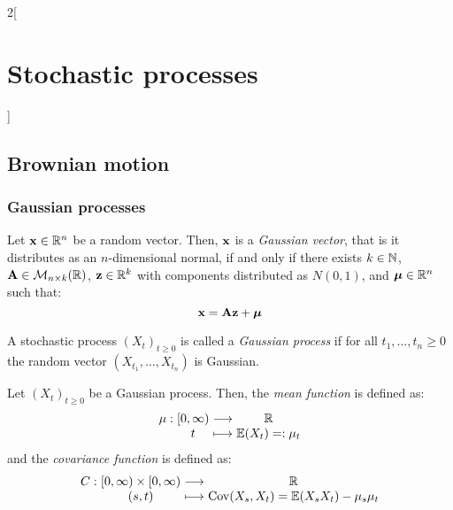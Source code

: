\documentclass[../../../main_math.tex]{subfiles}
\begin{document}
\begin{multicols}{2}[\section{Stochastic processes}]
  \subsection{Brownian motion}
  \subsubsection{Gaussian processes}
  \begin{proposition}\label{SP:Gaussian_vector}
    Let $\boldsymbol{\mathrm{x}}\in \mathbb{R}^n$ be a random vector. Then, $\boldsymbol{\mathrm{x}}$ is a \emph{Gaussian vector}, that is it distributes as an $n$-dimensional normal, if and only if there exists $k\in\mathbb{N}$, $\boldsymbol{\mathrm{A}}\in\mathcal{M}_{n\times k}(\mathbb{R})$, $\boldsymbol{\mathrm{z}}\in\mathbb{R}^k$ with \iid components distributed as $N(0,1)$, and $\boldsymbol{\mathrm{\mu}}\in\mathbb{R}^n$ such that: $$\boldsymbol{\mathrm{x}}=\boldsymbol{\mathrm{A}}\boldsymbol{\mathrm{z}}+\boldsymbol{\mathrm{\mu}}$$
  \end{proposition}
  \begin{definition}
    A stochastic process ${(X_t)}_{t\geq 0}$ is called a \emph{Gaussian process} if for all $t_1,\ldots,t_n\geq 0$ the random vector $(X_{t_1},\ldots,X_{t_n})$ is Gaussian.
  \end{definition}
  \begin{definition}
    Let ${(X_t)}_{t\geq 0}$ be a Gaussian process.
    Then, the \emph{mean function} is defined as:
    $$
      \function{\mu}{[0,\infty)}{\RR}{t}{\Exp(X_t)=:\mu_t}
    $$
    and the \emph{covariance function} is defined as:
    $$
      \function{C}{[0,\infty)\times[0,\infty)}{\RR}{(s,t)}{\cov(X_s,X_t)=\Exp(X_sX_t)-\mu_s\mu_t}
    $$
  \end{definition}

\end{multicols}
\end{document}

